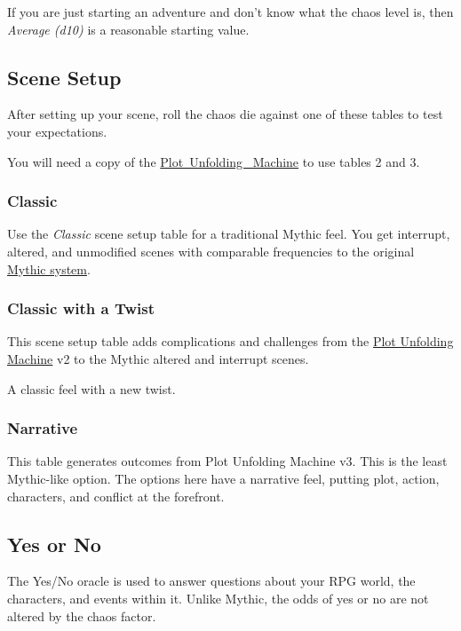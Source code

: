 If you are just starting an adventure and don't know what the chaos level is,
then \emph{Average (d10)} is a reasonable starting value.



\subsection{Scene Setup}
After setting up your scene, roll the chaos die against one of these tables to
test your expectations.
\begin{DndComment}{}
You will need a copy of the
\href{https://jeansenvaars.itch.io/plot-unfolding-machine}{Plot~Unfolding~
Machine} to use tables 2 and 3.
\end{DndComment}

\subsubsection{Classic}
Use the \emph{Classic} scene setup table for a traditional Mythic feel.
You get interrupt, altered, and unmodified scenes with comparable frequencies
to the original \href{https://www.wordmillgames.com/mythic-gme.html}{Mythic system}.

\clearfloat
\newpage

\subsubsection{Classic with a Twist}
This scene setup table adds complications and challenges from the
\href{https://jeansenvaars.itch.io/plot-unfolding-machine}{Plot Unfolding
Machine} v2 to the Mythic altered and interrupt scenes.

A classic feel with a new twist.


\subsubsection{Narrative}
This table generates outcomes from Plot Unfolding Machine v3. This is the least
Mythic-like option. The options here have a narrative feel, putting plot,
action, characters, and conflict at the forefront.


\subsection{Yes or No}
The Yes/No oracle is used to answer questions about your RPG world, the
characters, and events within it. Unlike Mythic, the odds of yes or no are not
altered by the chaos factor.


